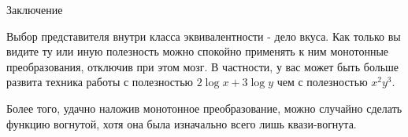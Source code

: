 \documentclass{beamer}
\begin{document}
\begin{frame}{Заключение}

Выбор представителя внутри класса эквивалентности - дело вкуса. Как только вы видите ту или иную полезность можно спокойно применять к ним монотонные преобразования, отключив при этом мозг. В частности, у вас может быть больше развита техника работы с полезностью $2 \log x + 3 \log y$ чем с полезностью $x^2 y^3.$ 

Более того, удачно наложив монотонное преобразование, можно случайно сделать функцию вогнутой, хотя она была изначально всего лишь квази-вогнута.

\end{frame}
\end{document}
